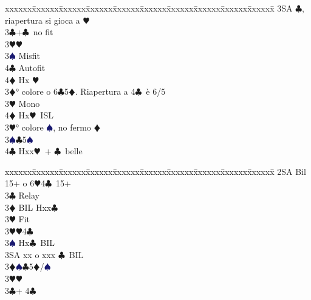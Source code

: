 \documentclass[a4paper,italian]{article}
\newcommand{\BC}{\textcolor{OliveGreen}{$\clubsuit$}}
\newcommand{\BD}{\textcolor{RedOrange}{$\vardiamondsuit$}}
\newcommand{\BH}{\textcolor{Red2}{$\varheartsuit${}}}
\newcommand{\BS}{\textcolor{MidnightBlue}{$\spadesuit${}}}
\newenvironment{bidtable}
{\begin{tabbing}

    xxxxxx\=xxxxxx\=xxxxxx\=xxxxxx\=xxxxxx\=xxxxxx\=xxxxxx\=xxxxxx\=xxxxxx\=xxxxxx\=\kill}
{\end{tabbing} }%
\begin{document}
\begin{multicols}{2}
\begin{bidtable}
                                            3SA \BC , riapertura si gioca a \BH \-\\
                                            3\BC {}+\BC\ no fit\+\\
                                            3\BH {}\BH \+\\
                                            3\BS \> Misfit\\
                                            4\BC \> Autofit\\
                                            4\BD \> Hx \BH \-\-\\
                                            3\BD {}° colore o 6\BC 5\BD . Riapertura a 4\BC\ è 6/5\+\\
                                            3\BH \> Mono\+\\
                                            4\BD \> Hx\BH\ ISL\-\-\\
                                            3\BH {}° colore \BS, no fermo \BD\\
                                            3\BS {}\BC 5\BS \\
                                            4\BC \> Hxx\BH\ + \BC\ belle\-\\
                                        \end{bidtable}
                                        \columnbreak
                                        \begin{bidtable}
                                            2SA \> Bil 15+ o 6\BH 4\BC\ 15+\+\\
                                            3\BC \> Relay\+\\
                                            3\BD \> BIL Hxx\BC \+\\
                                            3\BH \> Fit\-\\
                                            3\BH {}\BH 4\BC \\
                                            3\BS \> Hx\BC\ BIL\\
                                            3SA \> xx o xxx \BC\ BIL\-\\
                                            3\BD\BS {}\BC 5\BD /\BS \\
                                            3\BH {}\BH \-\\
                                            3\BC {}+ 4\BC \+\\

\end{bidtable}
\end{multicols}
\end{document}
